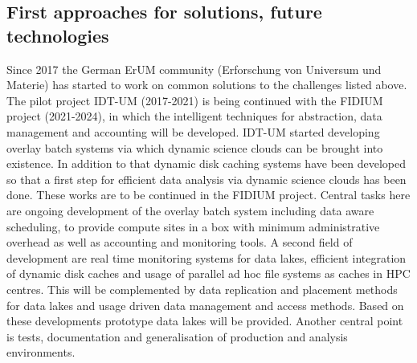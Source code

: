 \subsection{First approaches for solutions, future technologies}
Since 2017 the German ErUM community (Erforschung von Universum und
Materie) has started to work on common solutions to the challenges
listed above. The pilot project IDT-UM (2017-2021) is being continued
with the FIDIUM project (2021-2024), in which the intelligent
techniques for abstraction, data management and accounting will be
developed. IDT-UM started developing overlay batch systems via which dynamic science clouds
can be brought into existence. In addition to that dynamic disk caching systems have been
developed so that a first step for efficient data analysis via dynamic science clouds has been done.
These works are to be continued in the FIDIUM project. Central tasks here are
ongoing development of the overlay batch system including data aware scheduling, to provide 
compute sites in a box with minimum administrative overhead as well as accounting and monitoring tools.
A second field of development are real time monitoring systems for data lakes,
efficient integration of dynamic disk caches and usage of parallel ad hoc file systems as caches in HPC centres.
This will be complemented by data replication and placement methods for data lakes and usage
driven data management and access methods. Based on these developments prototype data lakes will be provided.
Another central point is tests, documentation and generalisation of production and analysis environments.

